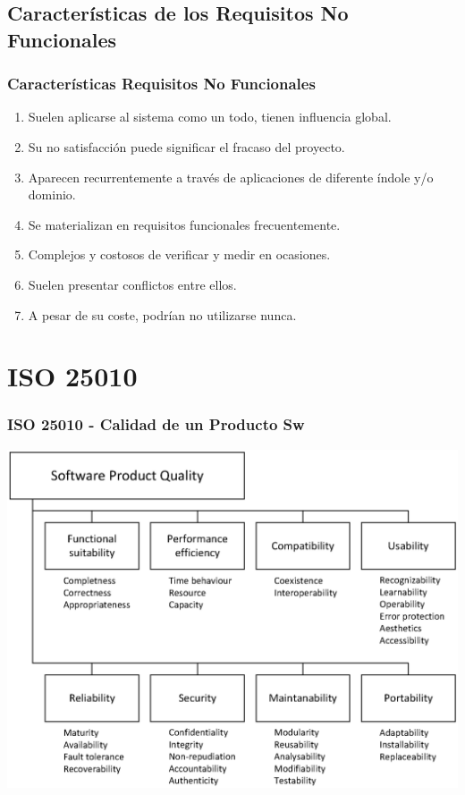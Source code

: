 \documentclass[handout,a4paper,slidestop,xcolor=pst,dvips,blue]{beamer}
\begin{document}
\subsection{Características de los Requisitos No Funcionales}

\begin{frame}[c]
    \frametitle{Características Requisitos No Funcionales}
    \begin{enumerate}
        \item Suelen aplicarse al sistema como un todo, tienen influencia global.
        \item Su no satisfacción puede significar el fracaso del proyecto.
        \item Aparecen recurrentemente a través de aplicaciones de diferente índole y/o dominio.
        \item Se materializan en requisitos funcionales frecuentemente.
        \item Complejos y costosos de verificar y medir en ocasiones.
        \item Suelen presentar conflictos entre ellos.
        \item A pesar de su coste, podrían no utilizarse nunca.
    \end{enumerate}
\end{frame}

\section{ISO 25010}

\begin{frame}[c]
    \frametitle{ISO 25010 - Calidad de un Producto Sw}
    \begin{center}
        \includegraphics[width=0.85\linewidth]{images/iso25010/iso25010.eps}
    \end{center}
\end{frame}
\end{document}
